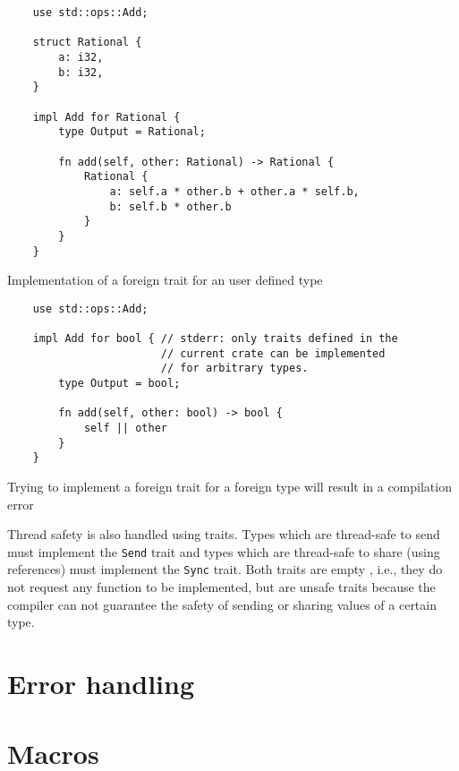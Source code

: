 \begin{listing}
	\begin{verbatim}
    use std::ops::Add;

    struct Rational {
        a: i32,
        b: i32,
    }

    impl Add for Rational {
        type Output = Rational;
        
        fn add(self, other: Rational) -> Rational {
            Rational {
                a: self.a * other.b + other.a * self.b,
                b: self.b * other.b
            }
        }
    }
    \end{verbatim}
  \caption{Implementation of a foreign trait for an user defined type}
  \label{lst:foreign_trait_impl}
\end{listing}

\begin{listing}
	\begin{verbatim}
    use std::ops::Add;

    impl Add for bool { // stderr: only traits defined in the
                        // current crate can be implemented 
                        // for arbitrary types.
        type Output = bool;
        
        fn add(self, other: bool) -> bool {
            self || other
        }
    }
    \end{verbatim}
  \caption{Trying to implement a foreign trait for a foreign type will result in a compilation error}
  \label{lst:foreign_trait_foreign_impl}
\end{listing}
Thread safety is also handled using traits. Types which are thread-safe to send must implement the \texttt{Send} trait and types which are thread-safe to share (using references) must implement the \texttt{Sync} trait. Both traits are empty , i.e., they do not request any function to be implemented, but are unsafe traits because the compiler can not guarantee the safety of sending or sharing values of a certain type.

\section{Error handling}
\section{Macros}
